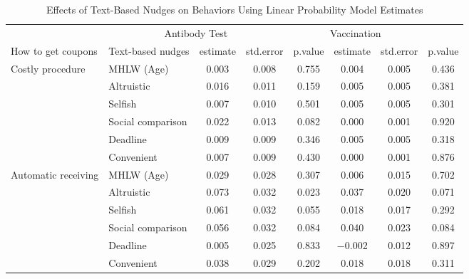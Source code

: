 \begin{table}

\caption{Effects of Text-Based Nudges on Behaviors Using Linear Probability Model Estimates \label{tab:act-reg-ftest}}
\centering
\begin{tabular}[t]{>{\raggedright\arraybackslash}p{5em}lcccccc}
\toprule
\multicolumn{2}{c}{ } & \multicolumn{3}{c}{Antibody Test} & \multicolumn{3}{c}{Vaccination} \\
\cmidrule(l{3pt}r{3pt}){3-5} \cmidrule(l{3pt}r{3pt}){6-8}
How to get coupons & Text-based nudges & estimate & std.error & p.value & estimate  & std.error  & p.value \\
\midrule
Costly procedure & MHLW (Age) & \num{0.003} & \num{0.008} & \num{0.755} & \num{0.004} & \num{0.005} & \num{0.436}\\
 & Altruistic & \num{0.016} & \num{0.011} & \num{0.159} & \num{0.005} & \num{0.005} & \num{0.381}\\
 & Selfish & \num{0.007} & \num{0.010} & \num{0.501} & \num{0.005} & \num{0.005} & \num{0.301}\\
 & Social comparison & \num{0.022} & \num{0.013} & \num{0.082} & \num{0.000} & \num{0.001} & \num{0.920}\\
 & Deadline & \num{0.009} & \num{0.009} & \num{0.346} & \num{0.005} & \num{0.005} & \num{0.318}\\
 & Convenient & \num{0.007} & \num{0.009} & \num{0.430} & \num{0.000} & \num{0.001} & \num{0.876}\\
Automatic receiving & MHLW (Age) & \num{0.029} & \num{0.028} & \num{0.307} & \num{0.006} & \num{0.015} & \num{0.702}\\
 & Altruistic & \num{0.073} & \num{0.032} & \num{0.023} & \num{0.037} & \num{0.020} & \num{0.071}\\
 & Selfish & \num{0.061} & \num{0.032} & \num{0.055} & \num{0.018} & \num{0.017} & \num{0.292}\\
 & Social comparison & \num{0.056} & \num{0.032} & \num{0.084} & \num{0.040} & \num{0.023} & \num{0.084}\\
 & Deadline & \num{0.005} & \num{0.025} & \num{0.833} & \num{-0.002} & \num{0.012} & \num{0.897}\\
 & Convenient & \num{0.038} & \num{0.029} & \num{0.202} & \num{0.018} & \num{0.018} & \num{0.311}\\
\bottomrule
\end{tabular}
\end{table}

